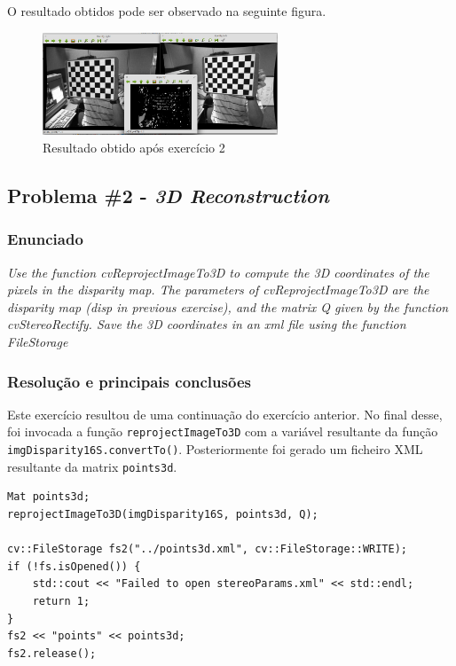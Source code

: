 \documentclass[portuguese, times, mirror]{revdetua}
\begin{document}
O resultado obtidos pode ser observado na seguinte figura. 

\begin{figure}[ht!]
\centering
\includegraphics[width=70mm]{img/ex1.png}
\caption{Resultado obtido após exercício 2}
\end{figure}



\subsection{Problema \#2 - \textit{3D Reconstruction}}

\subsubsection{Enunciado}
\textit{Use the function cvReprojectImageTo3D to compute the 3D coordinates of the pixels in the disparity 
map. The parameters of cvReprojectImageTo3D are the disparity map (disp in previous exercise), and the
matrix Q given by the function cvStereoRectify. Save the 3D coordinates in an xml file using the 
function FileStorage}


\subsubsection{Resolução e principais conclusões}

Este exercício resultou de uma continuação do exercício anterior. No final desse, foi invocada a função \texttt{reprojectImageTo3D} com a variável resultante da função \texttt{imgDisparity16S.convertTo()}. Posteriormente foi gerado um ficheiro XML resultante da matrix \texttt{points3d}.  


\begin{lstlisting}[caption=Aplicação da função reprojectImageTo3D e criação do ficheiro XML ,label=code:C]
Mat points3d;
reprojectImageTo3D(imgDisparity16S, points3d, Q);

cv::FileStorage fs2("../points3d.xml", cv::FileStorage::WRITE);
if (!fs.isOpened()) {
    std::cout << "Failed to open stereoParams.xml" << std::endl;
    return 1;
}
fs2 << "points" << points3d;
fs2.release();

\end{lstlisting}
\end{document}
